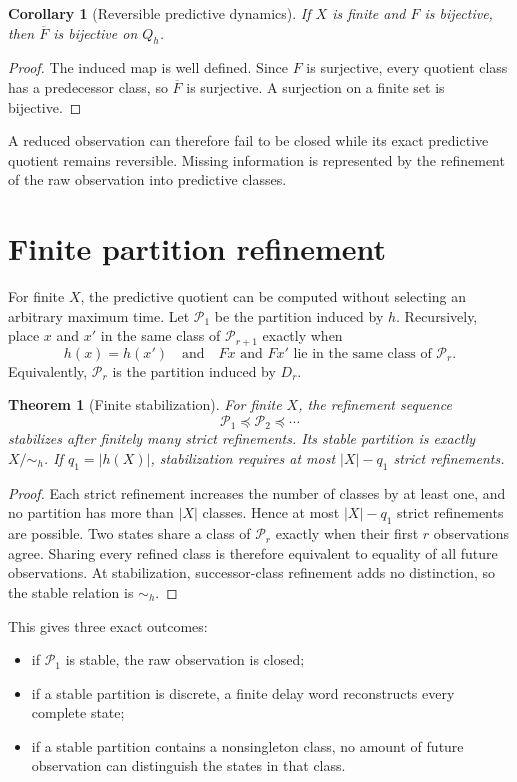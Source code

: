 \documentclass[11pt]{article}
\newtheorem{theorem}{Theorem}
\newtheorem{corollary}{Corollary}
\newcommand{\calP}{\mathcal{P}}
\begin{document}
\begin{corollary}[Reversible predictive dynamics]
If $X$ is finite and $F$ is bijective, then $\overline F$ is bijective on $Q_h$.
\end{corollary}

\begin{proof}
The induced map is well defined. Since $F$ is surjective, every quotient class has
a predecessor class, so $\overline F$ is surjective. A surjection on a finite set
is bijective.
\end{proof}

A reduced observation can therefore fail to be closed while its exact predictive
quotient remains reversible. Missing information is represented by the refinement
of the raw observation into predictive classes.

\section{Finite partition refinement}

For finite $X$, the predictive quotient can be computed without selecting an
arbitrary maximum time. Let $\calP_1$ be the partition induced by $h$. Recursively,
place $x$ and $x'$ in the same class of $\calP_{r+1}$ exactly when
\[
h(x)=h(x')
\quad\text{and}\quad
Fx\text{ and }Fx'\text{ lie in the same class of }\calP_r.
\]
Equivalently, $\calP_r$ is the partition induced by $D_r$.

\begin{theorem}[Finite stabilization]
For finite $X$, the refinement sequence
\[
\calP_1\preceq\calP_2\preceq\cdots
\]
stabilizes after finitely many strict refinements. Its stable partition is exactly
$X/{\sim_h}$. If $q_1=|h(X)|$, stabilization requires at most $|X|-q_1$ strict
refinements.
\end{theorem}

\begin{proof}
Each strict refinement increases the number of classes by at least one, and no
partition has more than $|X|$ classes. Hence at most $|X|-q_1$ strict refinements
are possible. Two states share a class of $\calP_r$ exactly when their first $r$
observations agree. Sharing every refined class is therefore equivalent to
equality of all future observations. At stabilization, successor-class refinement
adds no distinction, so the stable relation is $\sim_h$.
\end{proof}

This gives three exact outcomes:
\begin{itemize}[leftmargin=1.5em]
  \item if $\calP_1$ is stable, the raw observation is closed;
  \item if a stable partition is discrete, a finite delay word reconstructs every
  complete state;
  \item if a stable partition contains a nonsingleton class, no amount of future
  observation can distinguish the states in that class.
\end{itemize}
\end{document}
